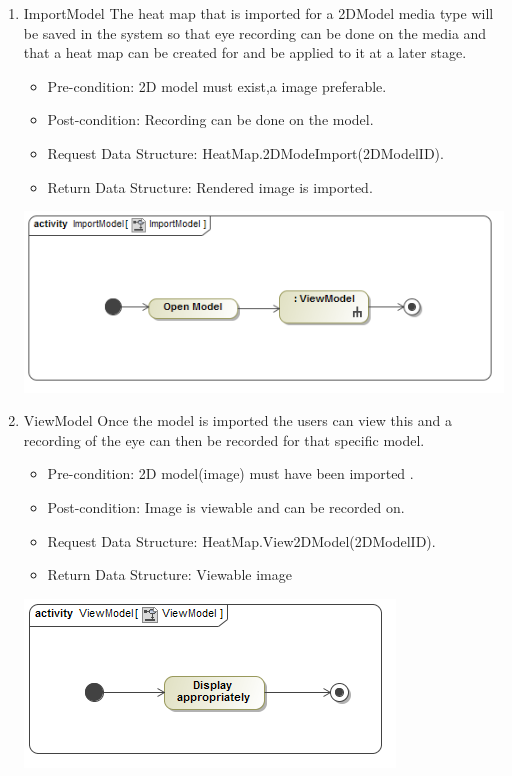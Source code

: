 	\begin{enumerate}
		\item{ImportModel}
		\newline
		The heat map that is imported for a 2DModel media type will be saved in the system so that eye recording can be done on the media and that a heat map can be created for and be applied to it at a later stage.
		\begin{itemize}
			\item Pre-condition: 2D model must exist,a image preferable.
			\item Post-condition: Recording can be done on the model.
			\item Request Data Structure: HeatMap.2DModeImport(2DModelID).
			\item Return Data Structure: Rendered image is imported.
		\end{itemize}
		
		\includegraphics[scale=0.5]{Diagrams/Activity_Diagram__ImportModel__ImportModel.png}

		\item{ViewModel}
		Once the model is imported the users can view this and a recording of the eye can then be recorded for that specific model.
		\begin{itemize}
			\item Pre-condition: 2D model(image) must have been imported .
			\item Post-condition: Image is viewable and can be recorded on.
			\item Request Data Structure: HeatMap.View2DModel(2DModelID).
			\item Return Data Structure: Viewable image
		\end{itemize}
		
		\includegraphics[scale=0.5]{Diagrams/Activity_Diagram__ViewModel__ViewModel.png}


\end{enumerate}
